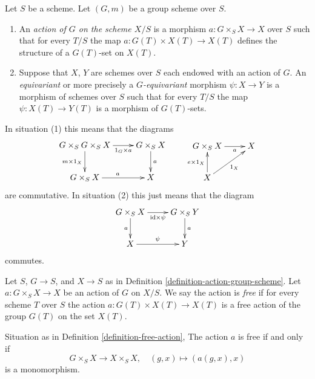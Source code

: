 \begin{definition}
\label{definition-action-group-scheme}
Let $S$ be a scheme. Let $(G, m)$ be a group scheme over $S$.
\begin{enumerate}
\item An {\it action of $G$ on the scheme $X/S$} is
a morphism $a : G \times_S X \to X$ over $S$ such that
for every $T/S$ the map $a : G(T) \times X(T) \to X(T)$
defines the structure of a $G(T)$-set on $X(T)$.
\item Suppose that $X$, $Y$ are schemes over $S$ each endowed
with an action of $G$. An {\it equivariant} or more precisely
a {\it $G$-equivariant} morphism $\psi : X \to Y$
is a morphism of schemes over $S$ such
that for every $T/S$ the map $\psi : X(T) \to Y(T)$ is
a morphism of $G(T)$-sets.
\end{enumerate}
\end{definition}

\noindent
In situation (1) this means that the diagrams
\begin{equation}
\label{equation-action}
\vcenter{
\xymatrix{
G \times_S G \times_S X \ar[r]_-{1_G \times a} \ar[d]_{m \times 1_X} &
G \times_S X \ar[d]^a \\
G \times_S X \ar[r]^a & X
}
}
\quad\quad
\vcenter{
\xymatrix{
G \times_S X \ar[r]_-a & X \\
X\ar[u]^{e \times 1_X} \ar[ru]_{1_X}
}
}
\end{equation}
are commutative. In situation (2) this just means that the diagram
$$
\xymatrix{
G \times_S X \ar[r]_-{\text{id} \times \psi} \ar[d]_a &
G \times_S Y \ar[d]^a \\
X \ar[r]^\psi & Y
}
$$
commutes.

\begin{definition}
\label{definition-free-action}
Let $S$, $G \to S$, and $X \to S$ as in
Definition \ref{definition-action-group-scheme}.
Let $a : G \times_S X \to X$ be an action of $G$ on $X/S$.
We say the action is {\it free} if for every scheme $T$ over $S$
the action $a : G(T) \times X(T) \to X(T)$ is a free action of
the group $G(T)$ on the set $X(T)$.
\end{definition}

\begin{lemma}
\label{lemma-free-action}
Situation as in Definition \ref{definition-free-action},
The action $a$ is free if and only if
$$
G \times_S X \to X \times_S X, \quad (g, x) \mapsto (a(g, x), x)
$$
is a monomorphism.
\end{lemma}

